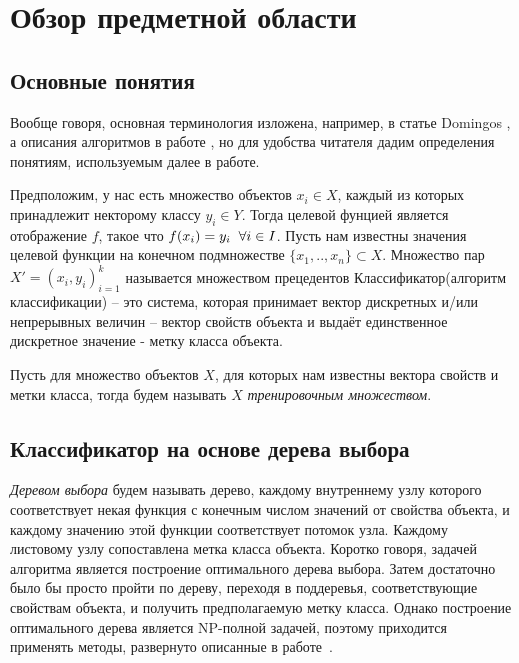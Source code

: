 \documentclass{article}
\begin{document}
\section{Обзор предметной области}
\subsection{Основные понятия}
Вообще говоря, основная терминология изложена, например, в статье Domingos \cite{fewUseful}, а описания алгоритмов в работе \cite{wu2008top}, но для удобства читателя дадим определения понятиям, используемым далее в работе. 

Предположим, у нас есть множество объектов $x_i \in X$, каждый из которых принадлежит некторому классу $y_i \in Y$. Тогда целевой фунцией является отображение $f$, такое что $f(x_i)=y_i \hspace{2mm} \forall i \in I$. Пусть нам известны значения целевой функции на конечном подмножестве $\{x_1,.., x_n\} \subset X$. Множество пар $X'=(x_i, y_i)_{i=1}^k$ называется множеством прецедентов
Классификатор(алгоритм классификации) -- это система, которая принимает вектор дискретных и/или непрерывных величин -- вектор свойств объекта и выдаёт единственное дискретное значение - метку класса объекта. 

Пусть для множество объектов $X$, для которых нам известны вектора свойств и метки класса, тогда будем называть $X$ \emph{тренировочным множеством}. 

\subsection{Классификатор на основе дерева выбора}
\emph{Деревом выбора} будем называть дерево, каждому внутреннему узлу которого соответствует некая функция с конечным числом значений от свойства объекта, и каждому значению этой функции соответствует потомок узла. Каждому листовому узлу сопоставлена метка класса объекта. Коротко говоря, задачей алгоритма является построение оптимального дерева выбора. Затем достаточно было бы просто пройти по дереву, переходя в поддеревья, соответствующие свойствам объекта, и получить предполагаемую метку класса. Однако построение оптимального дерева является NP-полной задачей, поэтому приходится применять методы, развернуто описанные в работе~\cite{desicionTree}.
\end{document}
